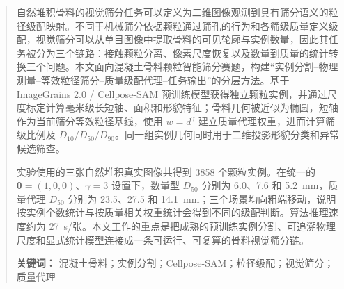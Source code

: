 \begin{abstract}
自然堆积骨料的视觉筛分任务可以定义为二维图像观测到具有筛分语义的粒径级配映射。不同于机械筛分依据颗粒通过筛孔的行为和各筛级质量定义级配，视觉筛分可以从单目图像中提取骨料的可见轮廓与实例数量，因此其任务被分为三个链路：接触颗粒分离、像素尺度恢复以及数量到质量的统计转换三个问题。本文面向混凝土骨料颗粒智能筛分赛题，构建“实例分割--物理测量--等效粒径筛分--质量级配代理--任务输出”的分层方法。基于 ImageGrains 2.0 / Cellpose-SAM 预训练模型获得独立颗粒实例，并通过尺度标定计算毫米级长短轴、面积和形貌特征；骨料几何被近似为椭圆，短轴作为当前筛分等效粒径基线，使用 $w=d^{\gamma}$ 建立质量代理权重，进而计算筛级比例及 $D_{10}/D_{50}/D_{90}$。同一组实例几何同时用于二维投影形貌分类和异常候选筛查。

实验使用的三张自然堆积真实图像共得到 3858 个颗粒实例。在统一的 $\boldsymbol{\theta}=(1,0,0)$、$\gamma=3$ 设置下，数量型 $D_{50}$ 分别为 6.0、7.6 和 5.2~mm，质量代理 $D_{50}$ 分别为 23.5、27.5 和 14.1~mm；三个场景均向粗端移动，说明按实例个数统计与按质量相关权重统计会得到不同的级配判断。算法推理速度约为 27~s/张。本文工作的重点是把成熟的预训练实例分割、可追溯物理尺度和显式统计模型连接成一条可运行、可复算的骨料视觉筛分链。

\textbf{关键词：} 混凝土骨料；实例分割；Cellpose-SAM；粒径级配；视觉筛分；质量代理
\end{abstract}
